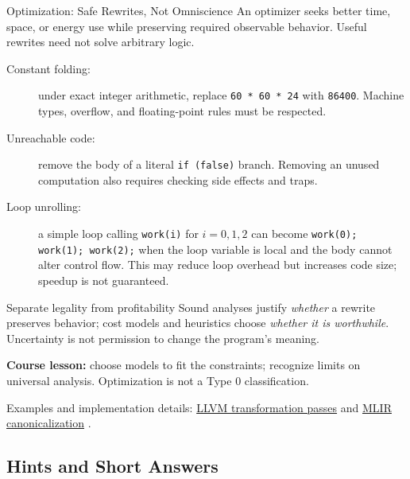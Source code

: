 \documentclass[10pt]{beamer}
\newcommand{\paperlink}[2]{%
  \href{#1}{\textcolor{blue!65!black}{#2}}%
}
\begin{document}
\begin{frame}{Optimization: Safe Rewrites, Not Omniscience}
  \small
  An optimizer seeks better time, space, or energy use while preserving
  required observable behavior. Useful rewrites need not solve arbitrary logic.
  \begin{description}
    \item[Constant folding:] under exact integer arithmetic, replace
      \texttt{60 * 60 * 24} with \texttt{86400}. Machine types, overflow,
      and floating-point rules must be respected.
    \pause
    \item[Unreachable code:] remove the body of a literal \texttt{if (false)}
      branch. Removing an unused computation also requires checking
      side effects and traps.
    \pause
    \item[Loop unrolling:] a simple loop calling \texttt{work(i)} for
      $i=0,1,2$ can become \texttt{work(0); work(1); work(2);} when the
      loop variable is local and the body cannot alter control flow.
      This may reduce loop overhead but increases code size; speedup is
      not guaranteed.
  \end{description}
  \pause
  \begin{block}{Separate legality from profitability}
    Sound analyses justify \emph{whether} a rewrite preserves behavior;
    cost models and heuristics choose \emph{whether it is worthwhile}.
    Uncertainty is not permission to change the program's meaning.
  \end{block}
  \textbf{Course lesson:} choose models to fit the constraints; recognize
  limits on universal analysis. Optimization is not a Type 0 classification.
  \par\smallskip
  {\scriptsize Examples and implementation details:
  \paperlink{https://llvm.org/docs/Passes.html}{LLVM transformation passes} and
  \paperlink{https://mlir.llvm.org/docs/Canonicalization/}{MLIR canonicalization}.}
\end{frame}

\subsection{Hints and Short Answers}
\end{document}
